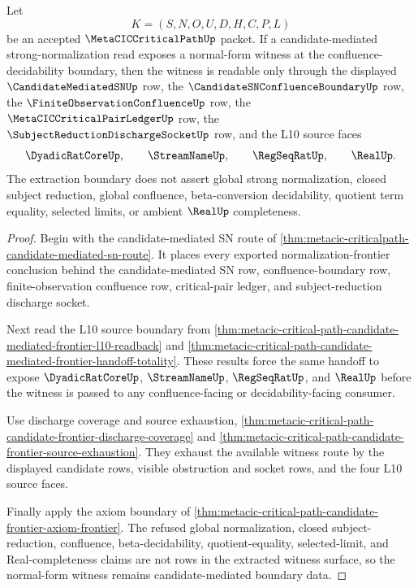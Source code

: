 \begin{theorem}
\label{thm:metacic-candidate-frontier-normal-form-witness-extraction}
Let
$$
K=(S,N,O,U,D,H,C,P,L)
$$
be an accepted $\MetaCICCriticalPathUp$ packet. If a candidate-mediated strong-normalization read exposes a normal-form witness at the confluence-decidability boundary, then the witness is readable only through the displayed $\CandidateMediatedSNUp$ row, the $\CandidateSNConfluenceBoundaryUp$ row, the $\FiniteObservationConfluenceUp$ row, the $\MetaCICCriticalPairLedgerUp$ row, the $\SubjectReductionDischargeSocketUp$ row, and the L10 source faces
$$
\DyadicRatCoreUp,\qquad
\StreamNameUp,\qquad
\RegSeqRatUp,\qquad
\RealUp .
$$
The extraction boundary does not assert global strong normalization, closed subject reduction, global confluence, beta-conversion decidability, quotient term equality, selected limits, or ambient $\RealUp$ completeness.
\end{theorem}
\begin{proof}
Begin with the candidate-mediated SN route of \autoref{thm:metacic-criticalpath-candidate-mediated-sn-route}. It places every exported normalization-frontier conclusion behind the candidate-mediated SN row, confluence-boundary row, finite-observation confluence row, critical-pair ledger, and subject-reduction discharge socket.

Next read the L10 source boundary from \autoref{thm:metacic-critical-path-candidate-mediated-frontier-l10-readback} and \autoref{thm:metacic-critical-path-candidate-mediated-frontier-handoff-totality}. These results force the same handoff to expose $\DyadicRatCoreUp$, $\StreamNameUp$, $\RegSeqRatUp$, and $\RealUp$ before the witness is passed to any confluence-facing or decidability-facing consumer.

Use discharge coverage and source exhaustion, \autoref{thm:metacic-critical-path-candidate-frontier-discharge-coverage} and \autoref{thm:metacic-critical-path-candidate-frontier-source-exhaustion}. They exhaust the available witness route by the displayed candidate rows, visible obstruction and socket rows, and the four L10 source faces.

Finally apply the axiom boundary of \autoref{thm:metacic-critical-path-candidate-frontier-axiom-frontier}. The refused global normalization, closed subject-reduction, confluence, beta-decidability, quotient-equality, selected-limit, and Real-completeness claims are not rows in the extracted witness surface, so the normal-form witness remains candidate-mediated boundary data.
\end{proof}

